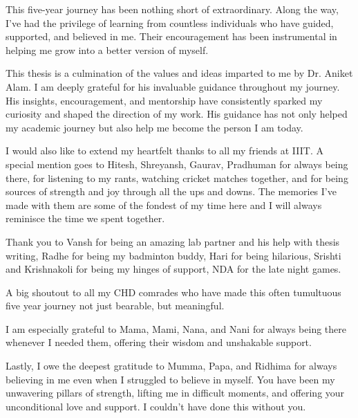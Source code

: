 \begin{sloppypar}

This five-year journey has been nothing short of extraordinary. Along the way, I’ve had the privilege of learning from countless individuals who have guided, supported, and believed in me. Their encouragement has been instrumental in helping me grow into a better version of myself.

This thesis is a culmination of the values and ideas imparted to me by Dr. Aniket Alam. I am deeply grateful for his invaluable guidance throughout my journey. His insights, encouragement, and  mentorship have consistently sparked my curiosity and shaped the direction of my work. His guidance has not only helped my academic journey but also help me become the person I am today.

I would also like to extend my heartfelt thanks to all my friends at IIIT. A special mention goes to Hitesh, Shreyansh, Gaurav, Pradhuman for always being there, for listening to my rants, watching cricket matches together, and for being sources of strength and joy through all the ups and downs. The memories I’ve made with them are some of the fondest of my time here and I will always reminisce the time we spent together.

Thank you to Vansh for being an amazing lab partner and  his help with thesis writing, Radhe for being my badminton buddy, Hari for being hilarious, Srishti and Krishnakoli for being my hinges of support,  NDA for the late night games.

A big shoutout to all my CHD comrades who have made this often tumultuous five year journey not just bearable, but meaningful.

I am especially grateful to Mama, Mami, Nana, and Nani for always being there whenever I needed them, offering their wisdom and unshakable support.

Lastly, I owe the deepest gratitude to Mumma, Papa, and Ridhima for always believing in me even when I struggled to believe in myself. You have been my unwavering pillars of strength, lifting me in difficult moments, and offering your unconditional love and support. I couldn’t have done this without you.

\end{sloppypar}